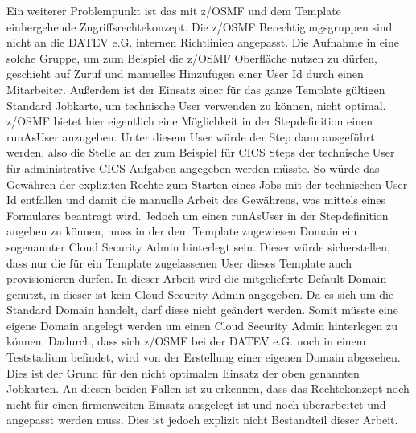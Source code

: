 Ein weiterer Problempunkt ist das mit z/OSMF und dem Template einhergehende Zugriffsrechtekonzept.
Die z/OSMF Berechtigungsgruppen sind nicht an die DATEV e.G. internen Richtlinien angepasst.
Die Aufnahme in eine solche Gruppe, um zum Beispiel die z/OSMF Oberfläche nutzen zu dürfen, geschieht auf Zuruf und manuelles Hinzufügen einer User Id durch einen Mitarbeiter.
Außerdem ist der Einsatz einer für das ganze Template gültigen Standard Jobkarte, um technische User verwenden zu können, nicht optimal.
z/OSMF bietet hier eigentlich eine Möglichkeit in der Stepdefinition einen \glqq runAsUser\grqq{} anzugeben.
Unter diesem User würde der Step dann ausgeführt werden, also die Stelle an der zum Beispiel für CICS Steps der technische User für administrative CICS Aufgaben angegeben werden müsste.
So würde das Gewähren der expliziten Rechte zum Starten eines Jobs mit der technischen User Id entfallen und damit die manuelle Arbeit des \glqq Gewährens\grqq, was mittels eines Formulares beantragt wird.
Jedoch um einen \glqq runAsUser\grqq{} in der Stepdefinition angeben zu können, muss in der dem Template zugewiesen \glqq Domain\grqq{} ein sogenannter \glqq Cloud Security Admin\grqq{} hinterlegt sein.
Dieser würde sicherstellen, dass nur die für ein Template zugelassenen User dieses Template auch provisionieren dürfen.
In dieser Arbeit wird die mitgelieferte \glqq Default Domain\grqq{} genutzt, in dieser ist kein \glqq Cloud Security Admin\grqq{} angegeben.
Da es sich um die Standard \glqq Domain\grqq{} handelt, darf diese nicht geändert werden.
Somit müsste eine eigene \glqq Domain\grqq{} angelegt werden um einen \glqq Cloud Security Admin\grqq{} hinterlegen zu können.
Dadurch, dass sich z/OSMF bei der DATEV e.G. noch in einem Teststadium befindet, wird von der Erstellung einer eigenen \glqq Domain\grqq{} abgesehen.
Dies ist der Grund für den nicht optimalen Einsatz der oben genannten Jobkarten.
An diesen beiden Fällen ist zu erkennen, dass das Rechtekonzept noch nicht für einen firmenweiten Einsatz ausgelegt ist und noch überarbeitet und angepasst werden muss.
Dies ist jedoch explizit nicht Bestandteil dieser Arbeit.


 
